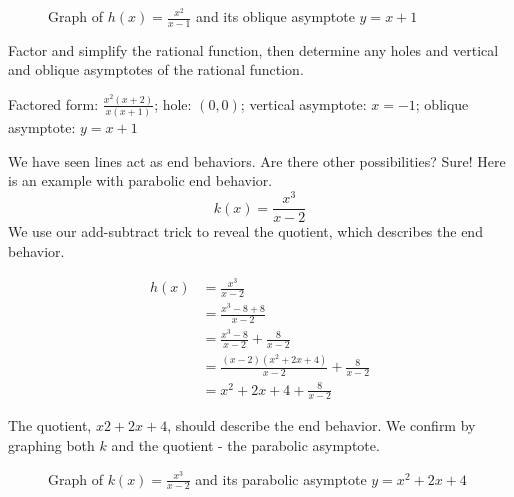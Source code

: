 \begin{figure}[htbp]
  \centering
  \caption{Graph of \( h(x) = \frac{x^2}{x - 1} \) and its oblique asymptote \( y = x + 1 \)}
\end{figure}

\begin{Exercise}[title=Rational Functions Practice 2, label=ratfunc2]
  Factor and simplify the rational function, then determine any holes and vertical and oblique asymptotes of the rational function.
  \vspace{40mm}
\end{Exercise}
\begin{Answer}[ref=ratfunc2]Factored form: $\frac{x^2(x + 2)}{x(x + 1)}$; hole: $(0, 0)$; vertical asymptote: $x = -1$; oblique asymptote: $y = x + 1$\end{Answer}

We have seen lines act as end behaviors. Are there other possibilities? Sure! Here is an example with parabolic end behavior. 
\[ k(x) = \frac{x^3}{x - 2} \]
We use our add-subtract trick to reveal the quotient, which describes the end behavior.

\begin{equation} \label{eq1}
\begin{split}
h(x) & = \frac{x^3}{x - 2} \\
& = \frac{x^3 - 8 + 8}{x - 2} \\ 
& = \frac{x^3 - 8}{x - 2} + \frac{8}{x - 2} \\
& = \frac{(x - 2)(x^2 + 2x + 4)}{x - 2} + \frac{8}{x - 2} \\
& = x^2 + 2x + 4 + \frac{8}{x - 2}
\end{split}
\end{equation}

The quotient, \( x2 + 2x + 4 \), should describe the end behavior. We confirm by graphing both \( k \) and the quotient - the parabolic asymptote.

\begin{figure}[htbp]
  \centering
  \caption{Graph of \( k(x) = \frac{x^3}{x - 2} \) and its parabolic asymptote \( y = x^2 + 2x + 4 \)}
\end{figure}